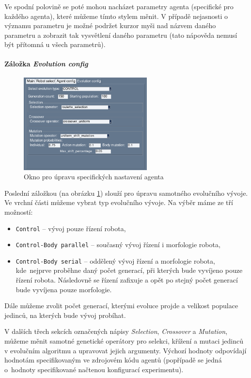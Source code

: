 Ve spodní polovině se poté mohou nacházet parametry agenta (specifické pro
každého agenta), které můžeme tímto stylem měnit. V případě nejasnosti o
významu parametru je možné podržet kurzor myši nad názvem daného parametru a
zobrazit tak vysvětlení daného parametru (tato nápověda nemusí být přítomná u
všech parametrů).

\paragraph{Záložka \emph{Evolution config}}
\begin{figure}[!htb]
    \centering
    \includegraphics[width=0.6\textwidth]{../img/GUI_evo_tab.jpg}
    \caption{Okno pro úpravu specifických nastavení agenta}
    \label{doc_12_fig:GUI_evo}
\end{figure}

Poslední záložkou (na obrázku \ref{doc_12_fig:GUI_evo}) slouží pro úpravu
samotného evolučního vývoje. Ve vrchní části můžeme vybrat typ evolučního
vývoje. Na výběr máme ze tří možností: 
\begin{itemize}
    \item \texttt{Control} -- vývoj pouze řízení robota,
    \item \texttt{Control-Body parallel} -- současný vývoj řízení i morfologie
        robota,
    \item \texttt{Control-Body serial} -- oddělený vývoj řízení a morfologie
        robota, kde~nejprve proběhne daný počet generací, při kterých bude
        vyvíjeno pouze řízení robota. Následovně se řízení zafixuje a opět po
        stejný počet generací bude vyvíjena pouze morfologie.
\end{itemize}

Dále můžeme zvolit počet generací, kterými evoluce projde a velikost populace
jedinců, na kterých bude vývoj probíhat.

V dalších třech sekcích označených nápisy \emph{Selection}, \emph{Crossover} a
\emph{Mutation}, můžeme měnit samotné genetické operátory pro selekci, křížení
a mutaci jedinců v evolučním algoritmu a upravovat jejich argumenty. Výchozí
hodnoty odpovídají hodnotám specifikovaným ve zdrojovém kódu agentů (popřípadě
se jedná o~hodnoty specifikované načtenou konfigurací experimentu).

